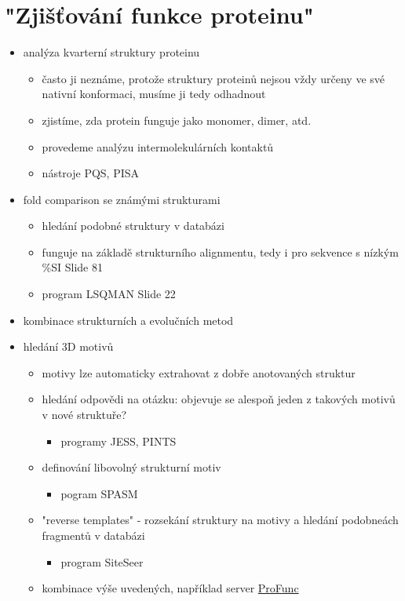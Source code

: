 \documentclass[DIV=8]{scrreprt}
\begin{document}
\section{"Zjišťování funkce proteinu"}

\begin{itemize}
    \item analýza kvarterní struktury proteinu
\begin{itemize}
    \item často ji neznáme, protože struktury proteinů nejsou vždy určeny ve své nativní konformaci, musíme ji tedy odhadnout
    \item zjistíme, zda protein funguje jako monomer, dimer, atd.
    \item provedeme analýzu intermolekulárních kontaktů
    \item nástroje PQS, PISA
\end{itemize}

    \item fold comparison se známými strukturami
\begin{itemize}
    \item hledání podobné struktury v databázi
    \item funguje na základě strukturního alignmentu, tedy i pro sekvence s nízkým \%SI Slide 81
    \item program LSQMAN Slide 22
\end{itemize}

    \item kombinace strukturních a evolučních metod
    \item hledání 3D motivů
\begin{itemize}
    \item motivy lze automaticky extrahovat z dobře anotovaných struktur
    \item hledání odpovědi na otázku: objevuje se alespoň jeden z takových motivů v nové struktuře?
\begin{itemize}
    \item programy JESS, PINTS
\end{itemize}

    \item definování libovolný strukturní motiv
\begin{itemize}
    \item pogram SPASM
\end{itemize}

    \item "reverse templates" - rozsekání struktury na motivy a hledání podobneách fragmentů v databázi
\begin{itemize}
    \item program SiteSeer
\end{itemize}

    \item kombinace výše uvedených, například server \href{http://www.ebi.ac.uk/thornton-srv/databases/ProFunc/}{ProFunc}
\end{itemize}

\end{itemize}
\end{document}
